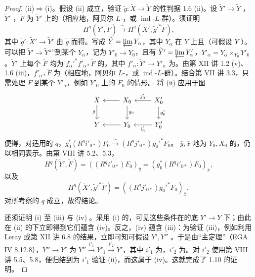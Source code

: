 \begin{proof}
(ii)$\Rightarrow$(i)。假设 (ii) 成立，验证 $\widetilde g:\widetilde X\to\widetilde Y$ 的性判据 1.6 (ii)。设 $\widetilde Y'\to\widetilde Y$ ，$\widetilde Y'$ ，$\widetilde F$ 为 $\widetilde Y'$ 上的（相应地，阿贝尔 $L$-，或 $\operatorname{ind}$-$L$-群）。须证明
\[H^q(\widetilde Y',\widetilde F)\xrightarrow{\sim}H^q(\widetilde X',\widetilde g'^*\widetilde F),\]
其中 $\widetilde g':\widetilde X'\to\widetilde Y'$ 由 $\widetilde g$ 而得。写成 $\widetilde Y=\varprojlim Y_\alpha$，其中 $Y_\alpha$ 在 $Y$ 上且（可假设 $Y$ ）。可以把 $\widetilde Y'\to\widetilde Y$“”到某个 $Y_\alpha$，记为 $Y'_0\to Y_0$，且有 $\widetilde Y'=\varprojlim Y'_\alpha$，$Y'_\alpha=Y_\alpha\times_{Y_0}Y'_0$。$\widetilde Y'$ 上每个 $\widetilde F$ 均为 $f_\alpha'^*f'_{\alpha*}\widetilde F$ 的，其中 $f'_\alpha:\widetilde Y'\to Y'_\alpha$ 为。由第 XII 讲 1.2 (v)、1.6 (iii)，$f'_{\alpha*}\widetilde F$ 为（相应地，阿贝尔 $L$-，或 $\operatorname{ind}$-$L$-群）。结合第 VII 讲 3.3，只需处理 $\widetilde F$ 到某个 $Y'_\alpha$，例如 $Y'_0$ 上的 $F_0$ 的情形。
将 (ii) 应用于图
\[
\begin{tikzcd}
X\arrow[d,"g"']&X_0\arrow[l]\arrow[d,"g_0"]&X'_0\arrow[l,"j'_0"']\arrow[d,"g'_0"]\\
Y&Y_0\arrow[l]&Y'_0\arrow[l,"i'_0"]
\end{tikzcd}
\]
便得，对适用的 $q$，$g_0^*(R^qi'_{0*})F_0\xrightarrow{\sim}(R^qj'_{0*})g_0'^*F_0$。 $\bar y,\bar x$ 地为 $Y_0,X_0$ 的，仍以相同表示。由第 VIII 讲 5.2、5.3，
\[H^q(\widetilde Y',\widetilde F)=((R^qi'_{0*})F_0)_{\bar y}=(g_0^*(R^qi'_{0*})F_0)_{\bar x},\]
以及
\[H^q(\widetilde X',\widetilde g'^*\widetilde F)=((R^qj'_{0*})g_0'^*F_0)_{\bar x},\]
对所考察的 $q$ 成立，故得结论。

还须证明 (i) 至 (iii) 与 (iv) 。采用 (i) 的，可见这些条件在的底 $Y'\to Y$ 下；由此在 (ii) 的下立即得到它们蕴含 (iv)。反之，(iv) 蕴含 (iii)：为验证 (iii)，例如利用 Leray 或第 XII 讲 6.8 的结果，立即可知可假设 $Y',Y''$ 。于是由“主定理”（EGA IV 8.12.8），$Y''\to Y'$ 为 $Y''\xrightarrow{i'_1}Y'_1\xrightarrow{i'_2}Y'$，其中 $i'_1$ 为，$i'_2$ 为。对 $i'_2$ 使用第 VIII 讲 5.5、5.8，便归结到为 $i'_1$ 验证 (ii)，而这属于 (iv)。这就完成了 1.10 的证明。
\end{proof}
